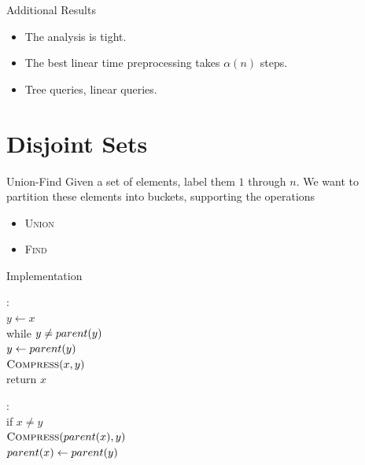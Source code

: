 \documentclass[aspectratio=169]{beamer}
\begin{document}
\begin{frame}{Additional Results}
	\begin{itemize}\onslide<+->
		\item The analysis is tight. \onslide<+->
		\item The best linear time preprocessing takes $\alpha(n)$  steps. \onslide<+->
		\item Tree queries, linear queries.
	\end{itemize}
\end{frame}

\section{Disjoint Sets}

\frame{\sectionpage}

\begin{frame}{Union-Find}
	Given a set of elements, label them $1$ through $n$.
	We want to partition these elements into buckets, supporting
	the operations
	\begin{itemize} \onslide<+->
		\item \textsc{Union} \onslide<+->
		\item \textsc{Find}
	\end{itemize}
\end{frame}

\begin{frame}{Implementation}
	\begin{minipage}{0.48\textwidth}
		\onslide<+->
		\begin{algo}
			: \+
			\\ $y \gets x$
			\\ while $y \ne \emph{parent}(y)$ \+
			\\ $y \gets \emph{parent}(y)$ \-
			\\ $\textsc{Compress}(x, y)$
			\\ return $x$
		\end{algo}
	\end{minipage}
	\begin{minipage}{0.48\textwidth}
		\onslide<+->
		\begin{algo}
			\textul{\textsc{Compress}($x$, $y$)}: \+
			\\ if $x \ne y$ \+
			\\ $\textsc{Compress}(\emph{parent}(x), y)$
			\\ $\emph{parent}(x) \gets \emph{parent}(y)$
		\end{algo}
	\end{minipage}
\end{frame}
\end{document}
